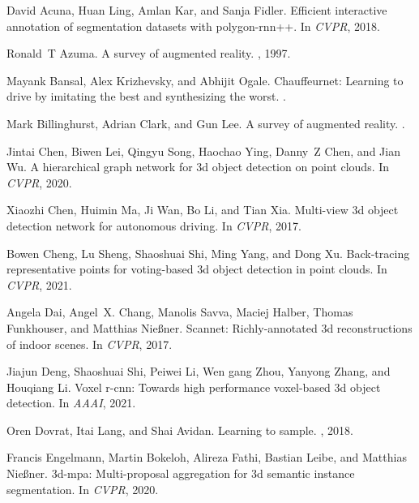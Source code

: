 \documentclass[final]{cvpr}
\begin{document}
{\small
\begin{thebibliography}{10}\itemsep=-1pt

David Acuna, Huan Ling, Amlan Kar, and Sanja Fidler.
\newblock Efficient interactive annotation of segmentation datasets with
  polygon-rnn++.
\newblock In {\em CVPR}, 2018.

Ronald~T Azuma.
\newblock A survey of augmented reality.
, 1997.

Mayank Bansal, Alex Krizhevsky, and Abhijit Ogale.
\newblock Chauffeurnet: Learning to drive by imitating the best and
  synthesizing the worst.
.

Mark Billinghurst, Adrian Clark, and Gun Lee.
\newblock A survey of augmented reality.
.

Jintai Chen, Biwen Lei, Qingyu Song, Haochao Ying, Danny~Z Chen, and Jian Wu.
\newblock A hierarchical graph network for 3d object detection on point clouds.
\newblock In {\em CVPR}, 2020.

Xiaozhi Chen, Huimin Ma, Ji Wan, Bo Li, and Tian Xia.
\newblock Multi-view 3d object detection network for autonomous driving.
\newblock In {\em CVPR}, 2017.

Bowen Cheng, Lu Sheng, Shaoshuai Shi, Ming Yang, and Dong Xu.
\newblock Back-tracing representative points for voting-based 3d object
  detection in point clouds.
\newblock In {\em CVPR}, 2021.

Angela Dai, Angel~X. Chang, Manolis Savva, Maciej Halber, Thomas Funkhouser,
  and Matthias Nie{\ss}ner.
\newblock Scannet: Richly-annotated 3d reconstructions of indoor scenes.
\newblock In {\em CVPR}, 2017.

Jiajun Deng, Shaoshuai Shi, Peiwei Li, Wen gang Zhou, Yanyong Zhang, and
  Houqiang Li.
\newblock Voxel r-cnn: Towards high performance voxel-based 3d object
  detection.
\newblock In {\em AAAI}, 2021.

Oren Dovrat, Itai Lang, and Shai Avidan.
\newblock Learning to sample.
, 2018.

Francis Engelmann, Martin Bokeloh, Alireza Fathi, Bastian Leibe, and Matthias
  Nie{\ss}ner.
\newblock 3d-mpa: Multi-proposal aggregation for 3d semantic instance
  segmentation.
\newblock In {\em CVPR}, 2020.


\end{thebibliography}}
\end{document}
